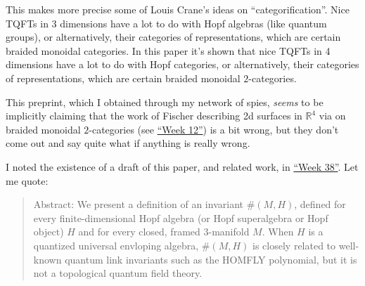\documentclass{article}
\def\tightlist{}
\renewcommand{\texttt}[1]{%
  \begingroup
  \ttfamily
  \begingroup\lccode`~=`/\lowercase{\endgroup\def~}{/\discretionary{}{}{}}%
  \begingroup\lccode`~=`[\lowercase{\endgroup\def~}{[\discretionary{}{}{}}%
  \begingroup\lccode`~=`.\lowercase{\endgroup\def~}{.\discretionary{}{}{}}%
  \catcode`/=\active\catcode`[=\active\catcode`.=\active
  \scantokens{#1\noexpand}%
  \endgroup
}
\begin{document}
\noindent
This makes more precise some of Louis Crane's ideas on
``categorification''. Nice TQFTs in 3 dimensions have a lot to do with
Hopf algebras (like quantum groups), or alternatively, their categories
of representations, which are certain braided monoidal categories. In
this paper it's shown that nice TQFTs in 4 dimensions have a lot to do
with Hopf categories, or alternatively, their categories of
representations, which are certain braided monoidal \(2\)-categories.

\noindent
This preprint, which I obtained through my network of spies,
\emph{seems} to be implicitly claiming that the work of Fischer
describing 2d surfaces in \(\mathbb{R}^4\) via on braided monoidal
\(2\)-categories (see \protect\hyperlink{week12}{``Week 12''}) is a bit
wrong, but they don't come out and say quite what if anything is really
wrong.

\noindent
I noted the existence of a draft of this paper, and related work, in
\protect\hyperlink{week38}{``Week 38''}. Let me quote:

\begin{quote}
Abstract: We present a definition of an invariant \(\#(M,H)\), defined
for every finite-dimensional Hopf algebra (or Hopf superalgebra or Hopf
object) \(H\) and for every closed, framed 3-manifold \(M\). When \(H\)
is a quantized universal envloping algebra, \(\#(M,H)\) is closely
related to well-known quantum link invariants such as the HOMFLY
polynomial, but it is not a topological quantum field theory.
\end{quote}
\end{document}
